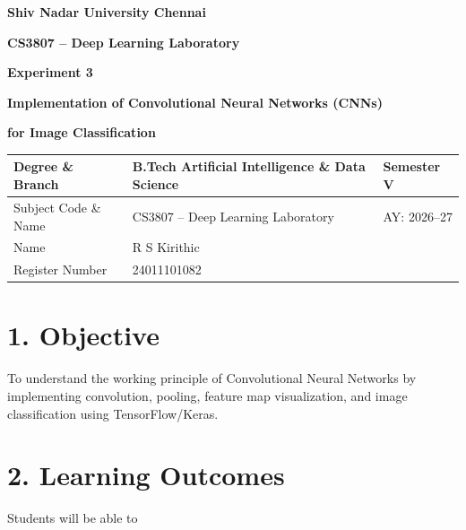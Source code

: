 \documentclass[11pt]{article}
\begin{document}

\begin{center}

{\Large\textbf{Shiv Nadar University Chennai}}

\vspace{3mm}

{\large\textbf{CS3807 -- Deep Learning Laboratory}}

\vspace{3mm}

{\Large\textbf{Experiment 3}}

\vspace{2mm}

{\Large\textbf{Implementation of Convolutional Neural Networks (CNNs)}}

{\Large\textbf{for Image Classification}}

\end{center}

\vspace{5mm}

\begin{tabular}{|p{4cm}|p{8cm}|p{2cm}|}
\hline
Degree \& Branch &
B.Tech Artificial Intelligence \& Data Science &
Semester V\\
\hline
Subject Code \& Name &
CS3807 -- Deep Learning Laboratory &
AY: 2026--27\\
\hline
Name & R S Kirithic & \\
\hline
Register Number & 24011101082 & \\
\hline
\end{tabular}


\section*{1. Objective}

To understand the working principle of Convolutional Neural Networks by
implementing convolution, pooling, feature map visualization, and image
classification using TensorFlow/Keras.


\section*{2. Learning Outcomes}

Students will be able to
\end{document}
